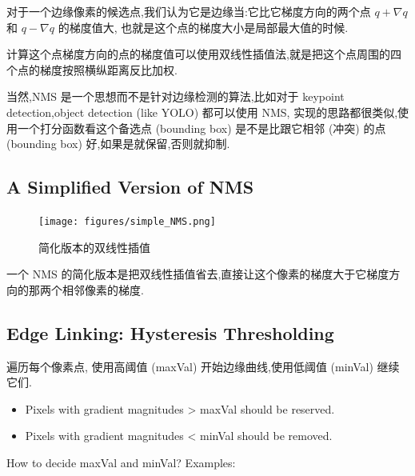 
对于一个边缘像素的候选点,我们认为它是边缘当:它比它梯度方向的两个点 $q+\nabla q$ 和 $q-\nabla q$ 的梯度值大,
也就是这个点的梯度大小是局部最大值的时候. 


计算这个点梯度方向的点的梯度值可以使用双线性插值法,就是把这个点周围的四个点的梯度按照横纵距离反比加权.

当然,NMS 是一个思想而不是针对边缘检测的算法,比如对于 keypoint detection,object detection (like YOLO) 都可以使用 NMS,
实现的思路都很类似,使用一个打分函数看这个备选点 (bounding box) 是不是比跟它相邻 (冲突) 的点 (bounding box) 好,如果是就保留,否则就抑制.

\subsection{A Simplified Version of NMS}

\begin{figure}[htbp]
    \centering
	\texttt{[image: figures/simple\_NMS.png]}
	\caption{简化版本的双线性插值}
\end{figure}

一个 NMS 的简化版本是把双线性插值省去,直接让这个像素的梯度大于它梯度方向的那两个相邻像素的梯度.

\subsection{Edge Linking: Hysteresis Thresholding}
遍历每个像素点, 使用高阈值 (maxVal) 开始边缘曲线,使用低阈值 (minVal) 继续它们.

\begin{itemize}
    \item Pixels with gradient magnitudes > maxVal should be reserved.
    \item Pixels with gradient magnitudes < minVal should be removed.
\end{itemize}

How to decide maxVal and minVal? Examples:

